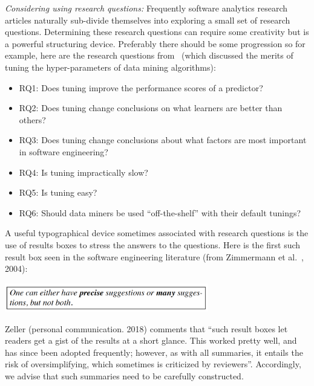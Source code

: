 \documentclass[preprint,10pt]{elsarticle}
\newcommand{\bi}{\begin{itemize}}
\newcommand{\ei}{\end{itemize}}
\begin{document}
{\em Considering using research questions:} Frequently software analytics research articles naturally sub-divide themselves into exploring a small set of research questions. Determining these research questions can require some creativity but is a powerful structuring device. Preferably there should be some progression so for example, here are the research questions from~\cite{fu2016} (which discussed the merits of tuning the hyper-parameters of data mining algorithms):

\bi
\item RQ1: Does tuning improve the performance scores of a predictor? 
\item RQ2: Does tuning change conclusions on what learners are better than others? 
\item RQ3: Does tuning change conclusions about what factors are most important in software engineering? 
\item RQ4: Is tuning impractically slow? 
\item RQ5:
Is tuning easy?
\item RQ6: Should data miners be used ``off-the-shelf'' with their default tunings? 
\ei


A useful typographical device sometimes associated with research questions is the use of results boxes to stress the answers to the questions. Here is the first such result box seen in the software engineering literature (from Zimmermann et al.~\cite{Zimmermann04}, 2004):

\centerline{\includegraphics[width=3.5in]{fig/resultbox.png}}

Zeller (personal communication. 2018) comments that ``such result boxes let readers get a gist of the results at a short glance.  This worked pretty well, and has since been adopted frequently; however, as with all summaries, it entails the risk of oversimplifying, which sometimes is criticized by reviewers''. Accordingly, we advise that such summaries need to be carefully constructed.
\end{document}
